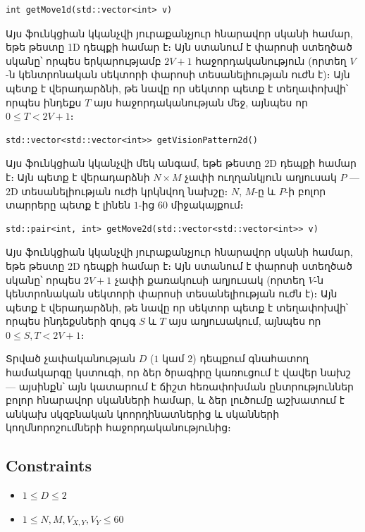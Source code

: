 \documentclass[12pt]{article}
\begin{document}
\begin{lstlisting}
int getMove1d(std::vector<int> v)
\end{lstlisting}

Այս ֆունկցիան կկանչվի յուրաքանչյուր հնարավոր սկանի համար, եթե թեստը 1D դեպքի համար է։ Այն ստանում է փարոսի ստեղծած սկանը՝ որպես երկարությամբ $2V + 1$ հաջորդականություն (որտեղ $V$-ն կենտրոնական սեկտորի փարոսի տեսանելիության ուժն է)։ Այն պետք է վերադարձնի, թե նավը որ սեկտոր պետք է տեղափոխվի՝ որպես ինդեքս $T$ այս հաջորդականության մեջ, այնպես որ $0 \leq T < 2V + 1$։

\begin{lstlisting}
std::vector<std::vector<int>> getVisionPattern2d()
\end{lstlisting}

Այս ֆունկցիան կկանչվի մեկ անգամ, եթե թեստը 2D դեպքի համար է։ Այն պետք է վերադարձնի $N \times M$ չափի ուղղանկյուն աղյուսակ $P$ — 2D տեսանելիության ուժի կրկնվող նախշը։ $N$, $M$-ը և $P$-ի բոլոր տարրերը պետք է լինեն $1$-ից $60$ միջակայքում։

\begin{lstlisting}
std::pair<int, int> getMove2d(std::vector<std::vector<int>> v)
\end{lstlisting}

Այս ֆունկցիան կկանչվի յուրաքանչյուր հնարավոր սկանի համար, եթե թեստը 2D դեպքի համար է։ Այն ստանում է փարոսի ստեղծած սկանը՝ որպես $2V + 1$ չափի քառակուսի աղյուսակ (որտեղ $V$-ն կենտրոնական սեկտորի փարոսի տեսանելիության ուժն է)։ Այն պետք է վերադարձնի, թե նավը որ սեկտոր պետք է տեղափոխվի՝ որպես ինդեքսների զույգ $S$ և $T$ այս աղյուսակում, այնպես որ $0 \leq S, T < 2V + 1$։

Տրված չափականության $D$ ($1$ կամ $2$) դեպքում գնահատող համակարգը կստուգի, որ ձեր ծրագիրը կառուցում է վավեր նախշ — այսինքն՝ այն կատարում է ճիշտ հեռափոխման ընտրություններ բոլոր հնարավոր սկանների համար, և ձեր լուծումը աշխատում է անկախ սկզբնական կոորդինատներից և սկանների կողմնորոշումների հաջորդականությունից։


\subsection{Constraints}

\vspace{0.1em}

\begin{itemize}
\item $1 \leq D \leq 2$
\item $1 \leq N, M, V_{X, Y}, V_Y \leq 60$
\end{itemize}
\end{document}
